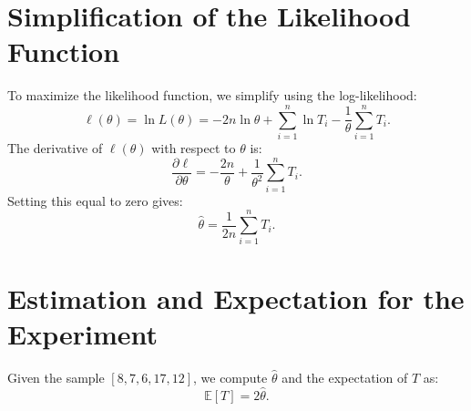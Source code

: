 \section{Simplification of the Likelihood Function}
To maximize the likelihood function, we simplify using the log-likelihood:
\[
\ell(\theta) = \ln L(\theta) = -2n \ln \theta + \sum_{i=1}^n \ln T_i - \frac{1}{\theta} \sum_{i=1}^n T_i.
\]
The derivative of \( \ell(\theta) \) with respect to \( \theta \) is:
\[
\frac{\partial \ell}{\partial \theta} = -\frac{2n}{\theta} + \frac{1}{\theta^2} \sum_{i=1}^n T_i.
\]
Setting this equal to zero gives:
\[
\hat{\theta} = \frac{1}{2n} \sum_{i=1}^n T_i.
\]

\section{Estimation and Expectation for the Experiment}
Given the sample \( [8, 7, 6, 17, 12] \), we compute \( \hat{\theta} \) and the expectation of \( T \) as:
\[
\mathbb{E}[T] = 2\hat{\theta}.
\]
